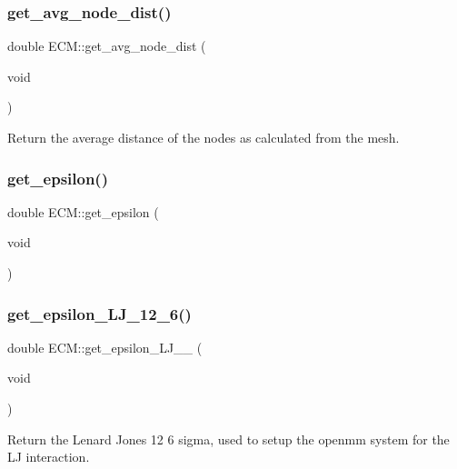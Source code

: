 \subsubsection{\texorpdfstring{get\_avg\_node\_dist()}{get\_avg\_node\_dist()}}
{\footnotesize\ttfamily double E\+C\+M\+::get\+\_\+avg\+\_\+node\+\_\+dist (\begin{DoxyParamCaption}\item[{void}]{ }\end{DoxyParamCaption})\hspace{0.3cm}{\ttfamily [inline]}}

Return the average distance of the nodes as calculated from the mesh. \mbox{\label{classECM_a0ce08b5de6aebfe790a0a6a9967d832c}} 
\subsubsection{\texorpdfstring{get\_epsilon()}{get\_epsilon()}}
{\footnotesize\ttfamily double E\+C\+M\+::get\+\_\+epsilon (\begin{DoxyParamCaption}\item[{void}]{ }\end{DoxyParamCaption})\hspace{0.3cm}{\ttfamily [inline]}}

\mbox{\label{classECM_a740df2034bc69bb26c6ba1780f644329}} 
\subsubsection{\texorpdfstring{get\_epsilon\_LJ\_12\_6()}{get\_epsilon\_LJ\_12\_6()}}
{\footnotesize\ttfamily double E\+C\+M\+::get\+\_\+epsilon\+\_\+\+L\+J\+\_\+\_ (\begin{DoxyParamCaption}\item[{void}]{ }\end{DoxyParamCaption})\hspace{0.3cm}{\ttfamily [inline]}}

Return the Lenard Jones 12 6 sigma, used to setup the openmm system for the LJ interaction. \mbox{\label{classECM_af36525691755fc391410e3784fe44113}} 
